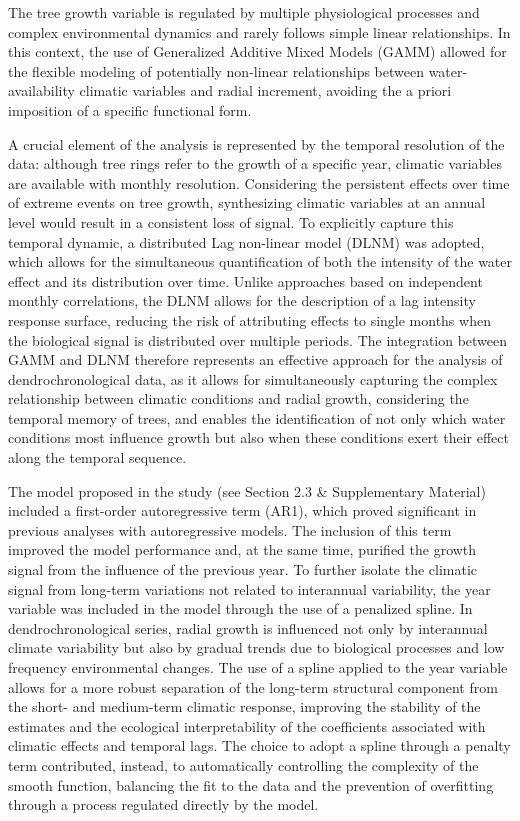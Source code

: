 \documentclass[12pt, a4paper]{article}
\begin{document}
The tree growth variable is regulated by multiple physiological processes and complex environmental dynamics and rarely follows simple linear relationships. In this context, the use of Generalized Additive Mixed Models (GAMM) allowed for the flexible modeling of potentially non-linear relationships between water-availability climatic variables and radial increment, avoiding the a priori imposition of a specific functional form.

A crucial element of the analysis is represented by the temporal resolution of the data: although tree rings refer to the growth of a specific year, climatic variables are available with monthly resolution. Considering the persistent effects over time of extreme events on tree growth, synthesizing climatic variables at an annual level would result in a consistent loss of signal. To explicitly capture this temporal dynamic, a distributed Lag non-linear model (DLNM) was adopted, which allows for the simultaneous quantification of both the intensity of the water effect and its distribution over time. Unlike approaches based on independent monthly correlations, the DLNM allows for the description of a lag intensity response surface, reducing the risk of attributing effects to single months when the biological signal is distributed over multiple periods. The integration between GAMM and DLNM therefore represents an effective approach for the analysis of dendrochronological data, as it allows for simultaneously capturing the complex relationship between climatic conditions and radial growth, considering the temporal memory of trees, and enables the identification of not only which water conditions most influence growth but also when these conditions exert their effect along the temporal sequence.

The model proposed in the study (see Section 2.3 \& Supplementary Material) included a first-order autoregressive term (AR1), which proved significant in previous analyses with autoregressive models. The inclusion of this term improved the model performance and, at the same time, purified the growth signal from the influence of the previous year. To further isolate the climatic signal from long-term variations not related to interannual variability, the year variable was included in the model through the use of a penalized spline. In dendrochronological series, radial growth is influenced not only by interannual climate variability but also by gradual trends due to biological processes and low frequency environmental changes. The use of a spline applied to the year variable allows for a more robust separation of the long-term structural component from the short- and medium-term climatic response, improving the stability of the estimates and the ecological interpretability of the coefficients associated with climatic effects and temporal lags. The choice to adopt a spline through a penalty term contributed, instead, to automatically controlling the complexity of the smooth function, balancing the fit to the data and the prevention of overfitting through a process regulated directly by the model.
\end{document}
